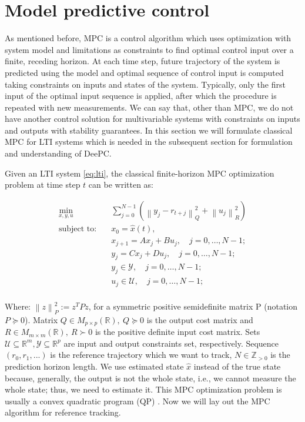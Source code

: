 \documentclass[12pt,a4paper]{report}
\newcommand{\norm}[1]{\left\lVert #1 \right\rVert}
\begin{document}
\section{Model predictive control}
As mentioned before, MPC is a control algorithm which uses optimization with system model and limitations as constraints to find optimal control input over a finite, receding horizon.
At each time step, future trajectory of the system is predicted using the model and optimal sequence of control input is computed taking constraints on inputs and states of the system. Typically, only the first
input of the optimal input sequence is applied, after which the procedure is repeated with new measurements. We can say that, other than MPC, we do not have another control solution for multivariable systems with constraints
on inputs and outputs with stability guarantees. In this section we will formulate classical MPC for LTI systems which is needed in the subsequent section for formulation and understanding of DeePC.

\vspace{1em}

Given an LTI system \eqref{eq:lti}, the classical finite-horizon MPC optimization problem at time step $t$ can be written as:

\begin{equation}
    \begin{aligned}
        \min_{x,y,u} \quad  &\sum_{j=0}^{N-1} \left(\norm{y_j - r_{t+j}}^{2}_{Q} + \norm{u_j}^{2}_{R}\right) \\
        \text{subject to:} \quad &x_0 = \hat{x}(t), \\
        &x_{j+1} = Ax_j + Bu_j, \quad j=0,\dots,N-1; \\
        &y_j = Cx_j + Du_j, \quad j=0,\dots,N-1; \\
        &y_j \in \mathcal{Y}, \quad j=0,\dots,N-1; \\
        &u_j \in \mathcal{U}, \quad j=0,\dots,N-1; \\
    \end{aligned}
    \label{eq:mpc}
\end{equation}


Where: \(\norm{z}^{2}_P := z^{T}Pz\), for a symmetric positive semidefinite matrix P (notation $P \succeq 0$). Matrix \(Q\in M_{p\times p}(\mathbb{R}), \ Q \succeq 0\) is the
output cost matrix and \(R\in M_{m\times m}(\mathbb{R}), \ R \succ 0\) is the positive definite input cost matrix. Sets \(\mathcal{U} \subseteq \mathbb{R}^m, \mathcal{Y} \subseteq \mathbb{R}^p\) are input and
output constraints set, respectively. Sequence \((r_0, r_1, ...) \) is the reference trajectory which we want to track, $N\in\mathbb{Z}_{>0}$ is the prediction horizon length. We use estimated state $\hat{x}$ instead of the true state because, generally,
the output is not the whole state, i.e., we cannot measure the whole state; thus, we need to estimate it. This MPC optimization problem is usually a convex quadratic program (QP) \cite{boyd2004convex}.
Now we will lay out the MPC algorithm for reference tracking.
\end{document}
